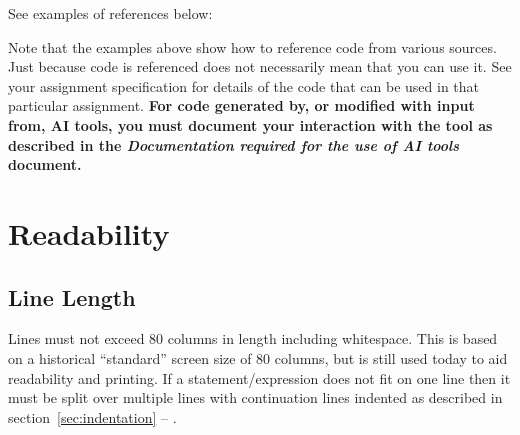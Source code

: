 \documentclass{article}
\newcommand{\icon}[1]{\raisebox{-3pt}{\texttt{[image: icons/\#1.png]}}}
\begin{document}
See examples of references below:

\nolinenumbers
{}

\linenumbers

\nolinenumbers
{}

\linenumbers
 
\nolinenumbers
{}

\linenumbers

\nolinenumbers
{}

\linenumbers

\nolinenumbers
{}

\linenumbers

Note that the examples above show how to reference code from various sources. Just because code is referenced
does not necessarily mean that you can use it. See your assignment specification for details of the code that can
be used in that particular assignment. \textbf{For code generated by, or modified with input from, AI tools, you must
document your interaction with the tool as described in the \textit{Documentation required for the use of AI tools} document.}

\section{Readability}

\subsection{Line Length\texorpdfstring{\protect\hfill\icon{CLANG-FORMAT}}{}}
Lines must not exceed 80 columns in length including whitespace.
This is based on a historical ``standard'' screen size of 80 columns, but is still used today to aid readability and printing.
If a statement/expression does not fit on one line then it must be split over multiple lines with continuation lines indented
as described in section~\ref{sec:indentation} -- .
\end{document}

